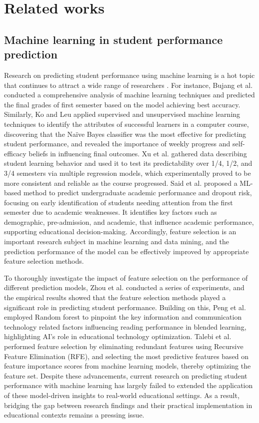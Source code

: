 \section{Related works}
\subsection{Machine learning in student performance prediction}
Research on predicting student performance using machine learning is a hot topic that continues to attract a wide range of researchers \cite{su2018exercise, silva2024identifying}. For instance, Bujang et al. \cite{bujang2021multiclass} conducted a comprehensive analysis of machine learning techniques and predicted the final grades of first semester based on the model achieving best accuracy. Similarly, Ko and Leu \cite{9144429} applied supervised and unsupervised machine learning techniques to identify the attributes of successful learners in a computer course, discovering that the Naïve Bayes classifier was the most effective for predicting student performance, and revealed the importance of weekly progress and self-efficacy beliefs in influencing final outcomes. Xu et al. \cite{9162494} gathered data describing student learning behavior and used it to test its predictability over 1/4, 1/2, and 3/4 semesters via multiple regression models, which experimentally proved to be more consistent and reliable as the course progressed. Said et al. \cite{ben2024early} proposed a ML-based method to predict undergraduate academic performance and dropout risk, focusing on early identification of students needing attention from the first semester due to academic weaknesses. It identifies key factors such as demographic, pre-admission, and academic, that influence academic performance, supporting educational decision-making. Accordingly, feature selection is an important research subject in machine learning and data mining, and the prediction performance of the model can be effectively improved by appropriate feature selection methods. 

To thoroughly investigate the impact of feature selection on the performance of different prediction models, Zhou et al. \cite{zhou2015performance} conducted a series of experiments, and the empirical results showed that the feature selection methods played a significant role in predicting student performance. Building on this, Peng et al. \cite{peng2023examining} employed Random forest to pinpoint the key information and communication technology related factors influencing reading performance in blended learning, highlighting AI's role in educational technology optimization. Talebi et al. \cite{talebi2024ensemble} performed feature selection by eliminating redundant features using Recursive Feature Elimination (RFE), and selecting the most predictive features based on feature importance scores from machine learning models, thereby optimizing the feature set. Despite these advancements, current research on predicting student performance with machine learning has largely failed to extended the application of these model-driven insights to real-world educational settings. As a result, bridging the gap between research findings and their practical implementation in educational contexts remains a pressing issue. 

